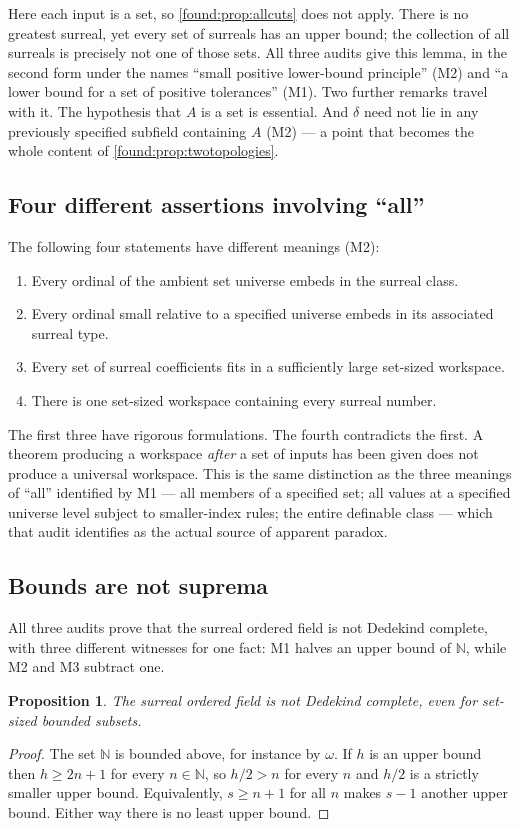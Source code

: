 \documentclass[11pt,letterpaper]{article}
\numberwithin{equation}{section}
\newtheorem{proposition}[theorem]{Proposition}
\theoremstyle{definition}
\theoremstyle{remark}
\newcommand{\N}{\mathbb N}
\begin{document}
Here each input is a set, so \cref{found:prop:allcuts} does not apply. There is
no greatest surreal, yet every set of surreals has an upper bound; the
collection of all surreals is precisely not one of those sets. All three audits
give this lemma, in the second form under the names ``small positive
lower-bound principle'' (M2) and ``a lower bound for a set of positive
tolerances'' (M1). Two further remarks travel with it. The hypothesis that $A$
is a set is essential. And $\delta$ need not lie in any previously specified
subfield containing $A$ (M2) --- a point that becomes the whole content of
\cref{found:prop:twotopologies}.

\subsection{Four different assertions involving ``all''}
\label{found:sub:fourall}
The following four statements have different meanings (M2):
\begin{enumerate}
\item Every ordinal of the ambient set universe embeds in the surreal class.
\item Every ordinal small relative to a specified universe embeds in its
associated surreal type.
\item Every set of surreal coefficients fits in a sufficiently large set-sized
workspace.
\item There is one set-sized workspace containing every surreal number.
\end{enumerate}
The first three have rigorous formulations. The fourth contradicts the first. A
theorem producing a workspace \emph{after} a set of inputs has been given does
not produce a universal workspace. This is the same distinction as the three
meanings of ``all'' identified by M1 --- all members of a specified set; all
values at a specified universe level subject to smaller-index rules; the entire
definable class --- which that audit identifies as the actual source of
apparent paradox.

\subsection{Bounds are not suprema}
\label{found:sub:notdedekind}
All three audits prove that the surreal ordered field is not Dedekind complete,
with three different witnesses for one fact: M1 halves an upper bound of $\N$,
while M2 and M3 subtract one.

\begin{proposition}\label{found:prop:incomplete}
The surreal ordered field is not Dedekind complete, even for set-sized bounded
subsets.
\end{proposition}
\begin{proof}
The set $\N$ is bounded above, for instance by $\omega$. If $h$ is an upper
bound then $h\ge 2n+1$ for every $n\in\N$, so $h/2>n$ for every $n$ and $h/2$
is a strictly smaller upper bound. Equivalently, $s\ge n+1$ for all $n$ makes
$s-1$ another upper bound. Either way there is no least upper bound.
\end{proof}
\end{document}
